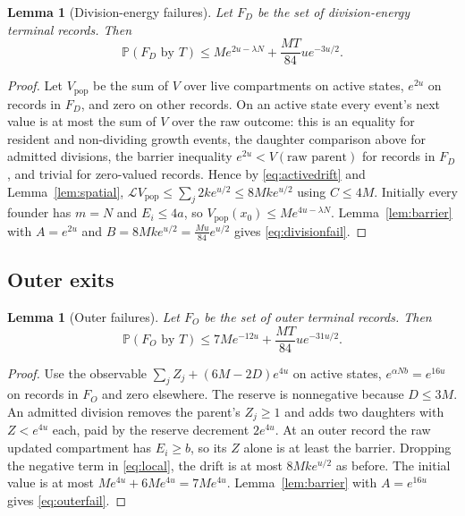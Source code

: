 \documentclass[11pt,a4paper]{article}
\theoremstyle{plain}
\newtheorem{lemma}[theorem]{Lemma}
\theoremstyle{definition}
\theoremstyle{remark}
\newcommand{\Prb}{\mathbb P}
\newcommand{\cL}{\mathcal L}
\begin{document}
\begin{lemma}[Division-energy failures]\label{lem:division}
Let $F_D$ be the set of division-energy terminal records. Then
\begin{equation}\label{eq:divisionfail}
\Prb(F_D\text{ by }T)\leq Me^{2u-\lambda N}+\frac{MT}{84}ue^{-3u/2}.
\end{equation}
\end{lemma}
\begin{proof}
Let $V_{\mathrm{pop}}$ be the sum of $V$ over live compartments on active states, $e^{2u}$ on records in $F_D$, and zero on other records. On an active state every event's next value is at most the sum of $V$ over the raw outcome: this is an equality for resident and non-dividing growth events, the daughter comparison above for admitted divisions, the barrier inequality $e^{2u}<V(\text{raw parent})$ for records in $F_D$, and trivial for zero-valued records. Hence by \eqref{eq:activedrift} and Lemma~\ref{lem:spatial}, $\cL V_{\mathrm{pop}}\leq\sum_j2ke^{u/2}\leq8Mke^{u/2}$ using $C\leq4M$. Initially every founder has $m=N$ and $E_i\leq4a$, so $V_{\mathrm{pop}}(x_0)\leq Me^{4u-\lambda N}$. Lemma~\ref{lem:barrier} with $A=e^{2u}$ and $B=8Mke^{u/2}=\frac{Mu}{84}e^{u/2}$ gives \eqref{eq:divisionfail}.
\end{proof}

\subsection{Outer exits}
\begin{lemma}[Outer failures]\label{lem:outer}
Let $F_O$ be the set of outer terminal records. Then
\begin{equation}\label{eq:outerfail}
\Prb(F_O\text{ by }T)\leq7Me^{-12u}+\frac{MT}{84}ue^{-31u/2}.
\end{equation}
\end{lemma}
\begin{proof}
Use the observable $\sum_jZ_j+(6M-2D)e^{4u}$ on active states, $e^{\alpha Nb}=e^{16u}$ on records in $F_O$ and zero elsewhere. The reserve is nonnegative because $D\leq3M$. An admitted division removes the parent's $Z_j\geq1$ and adds two daughters with $Z<e^{4u}$ each, paid by the reserve decrement $2e^{4u}$. At an outer record the raw updated compartment has $E_i\geq b$, so its $Z$ alone is at least the barrier. Dropping the negative term in \eqref{eq:local}, the drift is at most $8Mke^{u/2}$ as before. The initial value is at most $Me^{4u}+6Me^{4u}=7Me^{4u}$. Lemma~\ref{lem:barrier} with $A=e^{16u}$ gives \eqref{eq:outerfail}.
\end{proof}
\end{document}
